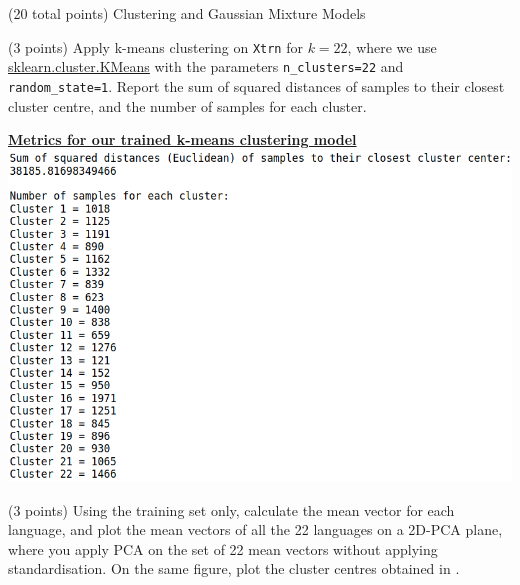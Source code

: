 \documentclass[12pt]{article}
\begin{document}
\begin{question}{(20 total points) Clustering and Gaussian Mixture Models}  


  


  \medskip
   \begin{subquestion}{(3 points)
       Apply k-means clustering on {\tt Xtrn} for $k = 22$, where we use
       \href{https://scikit-learn.org/0.19/modules/generated/sklearn.cluster.KMeans.html}{sklearn.cluster.KMeans}
       with the parameters {\tt n\_clusters=22} and {\tt random\_state=1}.
       Report the sum of squared distances of samples to their closest
       cluster centre, and the number of samples for each cluster.
     } \label{Q3.1}
   

      \begin{answerbox}{28em}
        \textbf{\underline{Metrics for our trained k-means clustering model}}
        \vspace{0.3cm}\\
         \includegraphics[width=1\textwidth]{images/q31.png}
      \end{answerbox}
  


   \end{subquestion}
   \begin{subquestion}{(3 points)
       Using the training set only,
       calculate the mean vector for each language, and plot the mean
       vectors of all the 22 languages on a 2D-PCA plane, where you
       apply PCA on the set of 22 mean vectors without applying
       standardisation.  
       On the same figure, plot the cluster centres obtained in .
     } \label{Q3.2}


\end{subquestion}
\end{question}
\end{document}
